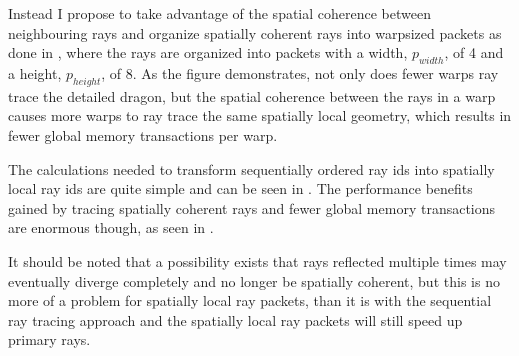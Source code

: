 Instead I propose to take advantage of the spatial coherence between
neighbouring rays and organize spatially coherent rays into warpsized packets as
done in , where the rays are organized into packets
with a width, $p_{width}$, of 4 and a height, $p_{height}$, of 8. As the figure
demonstrates, not only does fewer warps ray trace the detailed dragon, but the
spatial coherence between the rays in a warp causes more warps to ray trace the
same spatially local geometry, which results in fewer global memory transactions
per warp.

\begin{figure}
  \hspace{20pt}
  \caption[Sequantial and spatially coherent rays per warp.]{}
\end{figure}

The calculations needed to transform sequentially ordered ray ids into spatially
local ray ids are quite simple and can be seen in . The
performance benefits gained by tracing spatially coherent rays and fewer global
memory transactions are enormous though, as seen in
.

It should be noted that a possibility exists that rays reflected multiple times
may eventually diverge completely and no longer be spatially coherent, but this
is no more of a problem for spatially local ray packets, than it is with the
sequential ray tracing approach and the spatially local ray packets will still
speed up primary rays.


